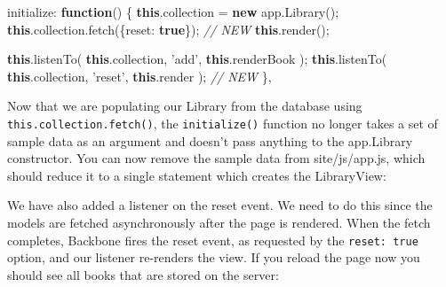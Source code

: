 \documentclass[9pt]{book}
\newenvironment{Shaded}{}{}
\newcommand{\KeywordTok}[1]{\textcolor[rgb]{0.00,0.44,0.13}{\textbf{{#1}}}}
\newcommand{\DataTypeTok}[1]{\textcolor[rgb]{0.56,0.13,0.00}{{#1}}}
\newcommand{\StringTok}[1]{\textcolor[rgb]{0.25,0.44,0.63}{{#1}}}
\newcommand{\CommentTok}[1]{\textcolor[rgb]{0.38,0.63,0.69}{\textit{{#1}}}}
\newcommand{\OtherTok}[1]{\textcolor[rgb]{0.00,0.44,0.13}{{#1}}}
\newcommand{\FunctionTok}[1]{\textcolor[rgb]{0.02,0.16,0.49}{{#1}}}
\newcommand{\NormalTok}[1]{{#1}}
\begin{document}
\begin{Shaded}
\begin{Highlighting}[]
\NormalTok{initialize: }\KeywordTok{function}\NormalTok{() \{}
    \KeywordTok{this}\NormalTok{.}\FunctionTok{collection} \NormalTok{= }\KeywordTok{new} \OtherTok{app}\NormalTok{.}\FunctionTok{Library}\NormalTok{();}
    \KeywordTok{this}\NormalTok{.}\OtherTok{collection}\NormalTok{.}\FunctionTok{fetch}\NormalTok{(\{}\DataTypeTok{reset}\NormalTok{: }\KeywordTok{true}\NormalTok{\}); }\CommentTok{// NEW}
    \KeywordTok{this}\NormalTok{.}\FunctionTok{render}\NormalTok{();}

    \KeywordTok{this}\NormalTok{.}\FunctionTok{listenTo}\NormalTok{( }\KeywordTok{this}\NormalTok{.}\FunctionTok{collection}\NormalTok{, }\StringTok{'add'}\NormalTok{, }\KeywordTok{this}\NormalTok{.}\FunctionTok{renderBook} \NormalTok{);}
    \KeywordTok{this}\NormalTok{.}\FunctionTok{listenTo}\NormalTok{( }\KeywordTok{this}\NormalTok{.}\FunctionTok{collection}\NormalTok{, }\StringTok{'reset'}\NormalTok{, }\KeywordTok{this}\NormalTok{.}\FunctionTok{render} \NormalTok{); }\CommentTok{// NEW}
\NormalTok{\},}
\end{Highlighting}
\end{Shaded}

Now that we are populating our Library from the database using
\texttt{this.collection.fetch()}, the \texttt{initialize()} function no
longer takes a set of sample data as an argument and doesn't pass
anything to the app.Library constructor. You can now remove the sample
data from site/js/app.js, which should reduce it to a single statement
which creates the LibraryView:

\begin{Shaded}
\end{Shaded}

We have also added a listener on the reset event. We need to do this
since the models are fetched asynchronously after the page is rendered.
When the fetch completes, Backbone fires the reset event, as requested
by the \texttt{reset: true} option, and our listener re-renders the
view. If you reload the page now you should see all books that are
stored on the server:
\end{document}
